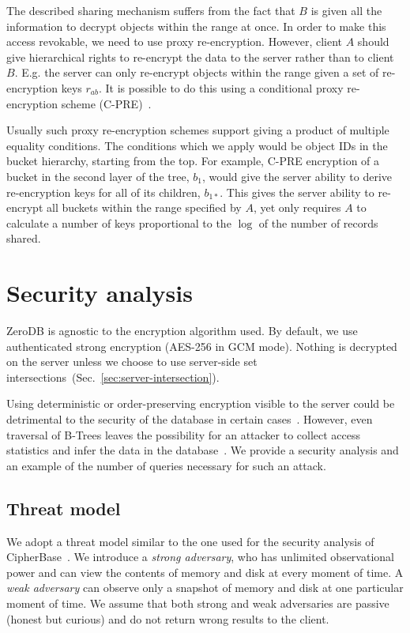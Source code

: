 \documentclass[notitlepage,longbibliography]{revtex4-1}
\begin{document}
The described sharing mechanism suffers from the fact that $B$ is given all the information to decrypt objects within the range at once.
In order to make this access revokable, we need to use proxy re-encryption.
However, client $A$ should give hierarchical rights to re-encrypt the data to the server rather than to client $B$.
E.g. the server can only re-encrypt objects within the range given a set of re-encryption keys $r_{ab}$.
It is possible to do this using a conditional proxy re-encryption scheme (C-PRE)~\cite{conditional-pre-2009,unidirectional-pre-2010,conditional-pre-2014,hierarchical-pre}.

Usually such proxy re-encryption schemes support giving a product of multiple equality conditions.
The conditions which we apply would be object IDs in the bucket hierarchy, starting from the top.
For example, C-PRE encryption of a bucket in the second layer of the tree, $b_1$, would give the server ability to derive re-encryption keys for all of its children, $b_{1*}$.
This gives the server ability to re-encrypt all buckets within the range specified by $A$, yet only requires $A$ to calculate a number of keys proportional to the $\log$ of the number of records shared.

\section{Security analysis}

ZeroDB is agnostic to the encryption algorithm used.
By default, we use authenticated strong encryption ({AES-256} in GCM mode).
Nothing is decrypted on the server unless we choose to use server-side set intersections~(Sec.~\ref{sec:server-intersection}).

Using deterministic or order-preserving encryption visible to the server could be detrimental to the security of the database in certain cases~\cite{cryptdb-hacked}.
However, even traversal of B-Trees leaves the possibility for an attacker to collect access statistics and infer the data in the database~\cite{access-pattern-attack}.
We provide a security analysis and an example of the number of queries necessary for such an attack.

\subsection{Threat model}

We adopt a threat model similar to the one used for the security analysis of CipherBase~\cite{cipherbase}.
We introduce a \emph{strong adversary}, who has unlimited observational power and can view the contents of memory and disk at every moment of time.
A \emph{weak adversary} can observe only a snapshot of memory and disk at one particular moment of time.
We assume that both strong and weak adversaries are passive (honest but curious) and do not return wrong results to the client.
\end{document}
